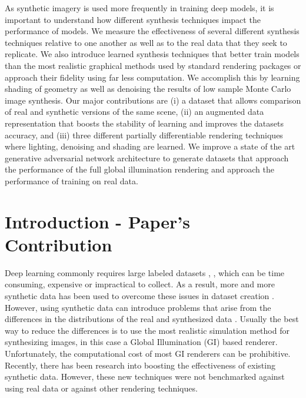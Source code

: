 \documentclass[10pt,twocolumn,letterpaper]{article}
\begin{document}
As synthetic imagery is used more frequently in training deep models, it is important to understand how different synthesis techniques impact the performance of models.  We measure the effectiveness of several different synthesis techniques relative to one another as well as to the real data that they seek to replicate.  We also introduce learned synthesis techniques that better train models than the most realistic graphical methods used by standard rendering packages or approach their fidelity using far less computation.  We accomplish this by learning shading of geometry as well as denoising the results of low sample Monte Carlo image synthesis.  Our major contributions are (i) a dataset that allows comparison of real and synthetic versions of the same scene, (ii) an augmented data representation that boosts the stability of learning and improves the datasets accuracy, and (iii) three different partially differentiable rendering techniques where lighting, denoising and shading are learned. We improve a state of the art generative adversarial network architecture to generate datasets that approach the performance of the full global illumination rendering and approach the performance of training on real data.
\section{Introduction - Paper's Contribution}

Deep learning commonly requires large labeled datasets \cite{imagenet}, \cite{coco}, which can be time consuming, expensive or impractical to collect.  As a result, more and more synthetic data has been used to overcome these issues in dataset creation \cite{DBLP:journals/corr/RichterVRK16} \cite{DBLP:journals/corr/ShafaeiLS16} \cite{DBLP:journals/corr/ZhangSYSLJF16} \cite{DBLP:journals/corr/SixtWL17}. However, using synthetic data can introduce problems that arise from the differences in the distributions of the real and synthesized data \cite{2014arXiv1409.7495G}.  Usually the best way to reduce the differences is to use the most realistic simulation method for synthesizing images, in this case a Global Illumination (GI) based renderer.  Unfortunately, the computational cost of most GI renderers can be prohibitive.  Recently, there has been research into boosting the effectiveness of existing synthetic data\cite{DBLP:journals/corr/ShrivastavaPTSW16}.  However, these new techniques were not benchmarked against using real data or against other rendering techniques.
\end{document}
